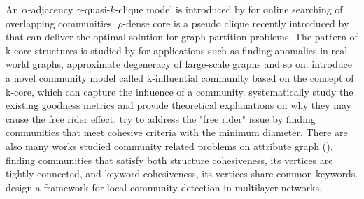 An $\alpha$-adjacency $\gamma$-quasi-$k$-clique model is introduced by \cite{cui2014local} for online searching of overlapping communities. $\rho$-dense core is a pseudo clique recently introduced by \cite{koujaku2016dense} that can deliver the optimal solution for graph partition problems. The pattern of k-core structures is studied by \cite{shin2016corescope} for applications such as finding anomalies in real world graphs, approximate degeneracy of large-scale graphs and so on. \cite{li2015influential} introduce a novel community model called k-influential community based on the concept of k-core, which can capture the influence of a community. %
\cite{wu2015robust} systematically study the existing goodness metrics and provide theoretical explanations on why they may cause the free rider effect. %
\cite{huang2015approximate} try to address the "free rider" issue by finding communities that meet cohesive criteria with the minimum diameter.
There are also many works studied community related problems on attribute graph (\cite{fang2016effective,shang2016agar,shang2017attribute,huang2017attribute}), \eg finding communities that satisfy both structure cohesiveness, \ie its vertices are tightly connected, and keyword cohesiveness, \ie its vertices share common keywords.
\cite{interdonato2017local} design a framework for local community detection in multilayer networks.